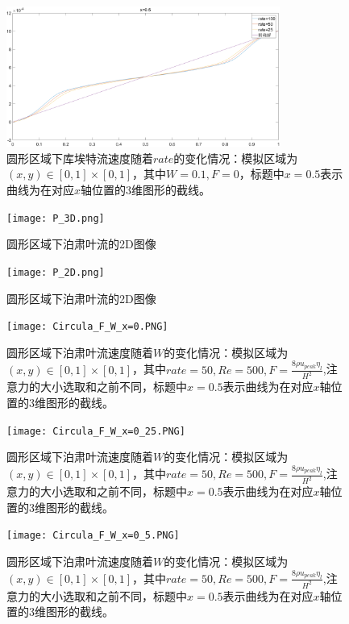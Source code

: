 \documentclass[11pt,UTF8]{ctexart}
\begin{document}
    \begin{figure}[h]
        \centerline{\includegraphics[width=0.8\textwidth]{Circul_P_rate/x=0_5.png}}
        \caption{圆形区域下库埃特流速度随着$rate$的变化情况：模拟区域为$(x,y)\in [0,1]\times [0,1]$，其中$W=0.1,F=0$，标题中$x=0.5$表示曲线为在对应$x$轴位置的3维图形的截线。}
        \label{img16}
    \end{figure}
    \begin{figure}[h]
        \centerline{\texttt{[image: P\_3D.png]}}
        \caption{圆形区域下泊肃叶流的2D图像}
        \label{img17}
    \end{figure}
    \begin{figure}[h]
        \centerline{\texttt{[image: P\_2D.png]}}
        \caption{圆形区域下泊肃叶流的2D图像}
        \label{img18}
    \end{figure}
    \begin{figure}[h]
        \centerline{\texttt{[image: Circula\_F\_W\_x=0.PNG]}}
        \caption{圆形区域下泊肃叶流速度随着$W$的变化情况：模拟区域为$(x,y)\in [0,1]\times [0,1]$，其中$rate=50,Re=500,F=\frac{8\rho u_{peak} \eta_l}{H^2}$,注意力的大小选取和之前不同，标题中$x=0.5$表示曲线为在对应$x$轴位置的3维图形的截线。}
        \label{img19}
    \end{figure}
    \begin{figure}[h]
        \centerline{\texttt{[image: Circula\_F\_W\_x=0\_25.PNG]}}
        \caption{圆形区域下泊肃叶流速度随着$W$的变化情况：模拟区域为$(x,y)\in [0,1]\times [0,1]$，其中$rate=50,Re=500,F=\frac{8\rho u_{peak} \eta_l}{H^2}$,注意力的大小选取和之前不同，标题中$x=0.5$表示曲线为在对应$x$轴位置的3维图形的截线。}
        \label{img20}
    \end{figure}
    \begin{figure}[h]
        \centerline{\texttt{[image: Circula\_F\_W\_x=0\_5.PNG]}}
        \caption{圆形区域下泊肃叶流速度随着$W$的变化情况：模拟区域为$(x,y)\in [0,1]\times [0,1]$，其中$rate=50,Re=500,F=\frac{8\rho u_{peak} \eta_l}{H^2}$,注意力的大小选取和之前不同，标题中$x=0.5$表示曲线为在对应$x$轴位置的3维图形的截线。}
        \label{img21}
    \end{figure}
\end{document}
